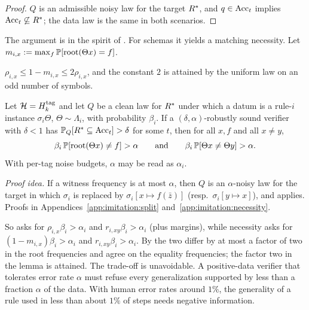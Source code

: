 \begin{proof}
$Q$ is an admissible noisy law for the target $R^{*}$, and $q\in\mathrm{Acc}_t$ implies $\mathrm{Acc}_t\not\subseteq R^{*}$; the data law is the same in both scenarios.
\end{proof}

The argument is in the spirit of \citet{kearns1993learning}. For schemas it yields a matching necessity. Let $m_{i,x}:=\max_f\mathbb{P}[\mathrm{root}(\Theta x)=f]$.

\begin{lemma}\label{lem:imitation:split}
$\rho_{i,x}\le1-m_{i,x}\le2\rho_{i,x}$, and the constant $2$ is attained by the uniform law on an odd number of symbols.
\end{lemma}

\begin{corollary}\label{cor:imitation:necessity}
Let $\mathcal{H}=H^{\mathrm{tag}}_k$ and let $Q$ be a clean law for $R^{*}$ under which a datum is a rule-$i$ instance $\sigma_i\Theta$, $\Theta\sim\Lambda_i$, with probability $\beta_i$. If a $(\delta,\alpha)$-robustly sound verifier with $\delta<1$ has $\mathbb{P}_Q[R^{*}\subseteq\mathrm{Acc}_t]>\delta$ for some $t$, then for all $x,f$ and all $x\neq y$,
\[
\beta_i\,\mathbb{P}[\mathrm{root}(\Theta x)\neq f]>\alpha\qquad\text{and}\qquad\beta_i\,\mathbb{P}[\Theta x\neq\Theta y]>\alpha.
\]
With per-tag noise budgets, $\alpha$ may be read as $\alpha_i$.
\end{corollary}

\noindent\emph{Proof idea.} If a witness frequency is at most $\alpha$, then $Q$ is an $\alpha$-noisy law for the target in which $\sigma_i$ is replaced by $\sigma_i[x\mapsto f(\bar z)]$ (resp.\ $\sigma_i[y\mapsto x]$), and  applies. Proofs in Appendices~\ref{app:imitation:split} and~\ref{app:imitation:necessity}.

So  asks for $\rho_{i,x}\beta_i>\alpha_i$ and $r_{i,xy}\beta_i>\alpha_i$ (plus margins), while necessity asks for $(1-m_{i,x})\beta_i>\alpha_i$ and $r_{i,xy}\beta_i>\alpha_i$. By  the two differ by at most a factor of two in the root frequencies and agree on the equality frequencies; the factor two in the lemma is attained. The trade-off is unavoidable. A positive-data verifier that tolerates error rate $\alpha$ must refuse every generalization supported by less than a fraction $\alpha$ of the data. With human error rates around $1\%$, the generality of a rule used in less than about $1\%$ of steps needs negative information.


